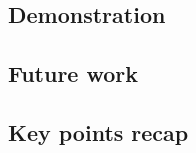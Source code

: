 \documentclass{beamer}
\begin{document}
	\subsection{Demonstration}
	
	\subsection{Future work}
	
	\subsection{Key points recap}
	

	

	

	
\end{document}

